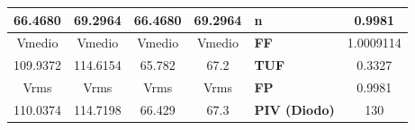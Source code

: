 \begin{table}[]
\begin{tabular}{|cc|cc|lc|}
		\multicolumn{1}{|c|}{66.4680}                                           & 69.2964                                           & \multicolumn{1}{c|}{66.4680}                                         & 69.2964                                          & \multicolumn{1}{l|}{\textbf{n}}                                                                                                                             & 0.9981                                                                                                                     \\ \hline
		\multicolumn{1}{|c|}{Vmedio}                                            & Vmedio                                            & \multicolumn{1}{c|}{Vmedio}                                          & Vmedio                                           & \multicolumn{1}{l|}{\textbf{FF}}                                                                                                                            & 1.0009114                                                                                                                  \\ \hline
		\multicolumn{1}{|c|}{109.9372}                                          & 114.6154                                          & \multicolumn{1}{c|}{65.782}                                          & 67.2                                             & \multicolumn{1}{l|}{\textbf{TUF}}                                                                                                                           & 0.3327                                                                                                                     \\ \hline
		\multicolumn{1}{|c|}{Vrms}                                              & Vrms                                              & \multicolumn{1}{c|}{Vrms}                                            & Vrms                                             & \multicolumn{1}{l|}{\textbf{FP}}                                                                                                                            & 0.9981                                                                                                                     \\ \hline
		\multicolumn{1}{|c|}{110.0374}                                          & 114.7198                                          & \multicolumn{1}{c|}{66.429}                                          & 67.3                                             & \multicolumn{1}{l|}{\textbf{PIV (Diodo)}}                                                                                                                   & 130                                                                                                                        \\ \hline

\end{tabular}
\end{table}
